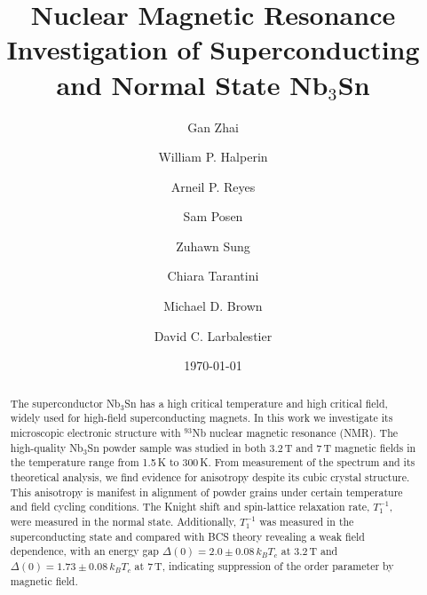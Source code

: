 \documentclass[aps,prl,reprint,superscriptaddress]{revtex4-2}
\begin{document}
	
	
	\title{Nuclear Magnetic Resonance Investigation of Superconducting and Normal State Nb$_3$Sn}
	
	\author{Gan Zhai}
	\author{William P. Halperin}
	\author{Arneil P. Reyes}
	\author{Sam Posen}
	\author{Zuhawn Sung}
	\author{Chiara Tarantini}
	\author{Michael D. Brown}
	\author{David C. Larbalestier}
	
	\date{\today}
	
	\begin{abstract}
	The superconductor Nb$_3$Sn has a high critical temperature and high critical field, widely used for high-field superconducting magnets. In this work we investigate its microscopic electronic structure with $^{93}$Nb nuclear magnetic resonance (NMR). The high-quality Nb$_3$Sn powder sample was studied in both 3.2\,T and 7\,T magnetic fields in the temperature range from 1.5\,K to 300\,K. From  measurement of the spectrum and its theoretical analysis, we find evidence for anisotropy despite its cubic crystal structure. This anisotropy is manifest in alignment of powder grains under certain temperature and field cycling conditions. The Knight shift and spin-lattice relaxation rate, $T_1^{-1}$, were measured in the normal state. Additionally, $T_1^{-1}$ was measured in the superconducting state and compared with  BCS theory revealing a weak field dependence, with an energy gap $\Delta(0)=2.0\pm0.08\,k_B T_c$ at 3.2\,T and $\Delta(0)=1.73\pm0.08\,k_B T_c$ at 7\,T, indicating suppression of the order parameter by magnetic field.
	\end{abstract}
	
	
	\maketitle
	
\end{document}
